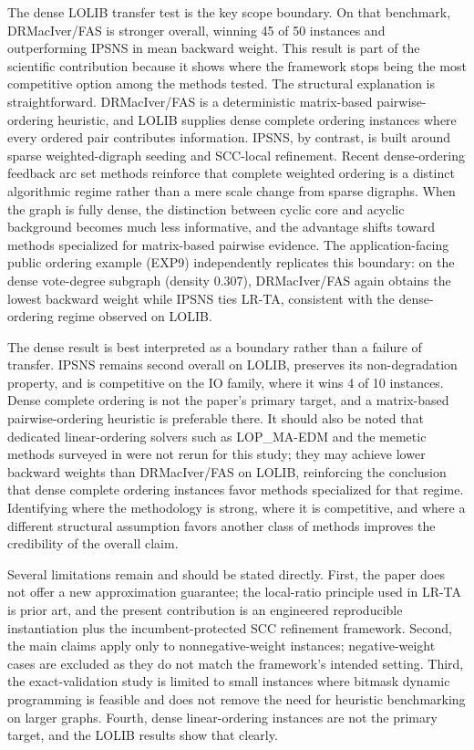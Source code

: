 The dense LOLIB transfer test is the key scope boundary. On that benchmark, DRMacIver/FAS is stronger overall, winning 45 of 50 instances and outperforming IPSNS in mean backward weight. This result is part of the scientific contribution because it shows where the framework stops being the most competitive option among the methods tested. The structural explanation is straightforward. DRMacIver/FAS is a deterministic matrix-based pairwise-ordering heuristic, and LOLIB supplies dense complete ordering instances where every ordered pair contributes information. IPSNS, by contrast, is built around sparse weighted-digraph seeding and SCC-local refinement. Recent dense-ordering feedback arc set methods \cite{FLRS10,OZ24} reinforce that complete weighted ordering is a distinct algorithmic regime rather than a mere scale change from sparse digraphs. When the graph is fully dense, the distinction between cyclic core and acyclic background becomes much less informative, and the advantage shifts toward methods specialized for matrix-based pairwise evidence. The application-facing public ordering example (EXP9) independently replicates this boundary: on the dense vote-degree subgraph (density 0.307), DRMacIver/FAS again obtains the lowest backward weight while IPSNS ties LR-TA, consistent with the dense-ordering regime observed on LOLIB.

The dense result is best interpreted as a boundary rather than a failure of transfer. IPSNS remains second overall on LOLIB, preserves its non-degradation property, and is competitive on the IO family, where it wins 4 of 10 instances. Dense complete ordering is not the paper's primary target, and a matrix-based pairwise-ordering heuristic is preferable there. It should also be noted that dedicated linear-ordering solvers such as LOP\_MA-EDM \cite{lop_ma_edm_repo} and the memetic methods surveyed in \cite{MRD12} were not rerun for this study; they may achieve lower backward weights than DRMacIver/FAS on LOLIB, reinforcing the conclusion that dense complete ordering instances favor methods specialized for that regime. Identifying where the methodology is strong, where it is competitive, and where a different structural assumption favors another class of methods improves the credibility of the overall claim.

Several limitations remain and should be stated directly. First, the paper does not offer a new approximation guarantee; the local-ratio principle used in LR-TA is prior art, and the present contribution is an engineered reproducible instantiation plus the incumbent-protected SCC refinement framework. Second, the main claims apply only to nonnegative-weight instances; negative-weight cases are excluded as they do not match the framework's intended setting. Third, the exact-validation study is limited to small instances where bitmask dynamic programming is feasible and does not remove the need for heuristic benchmarking on larger graphs. Fourth, dense linear-ordering instances are not the primary target, and the LOLIB results show that clearly.

